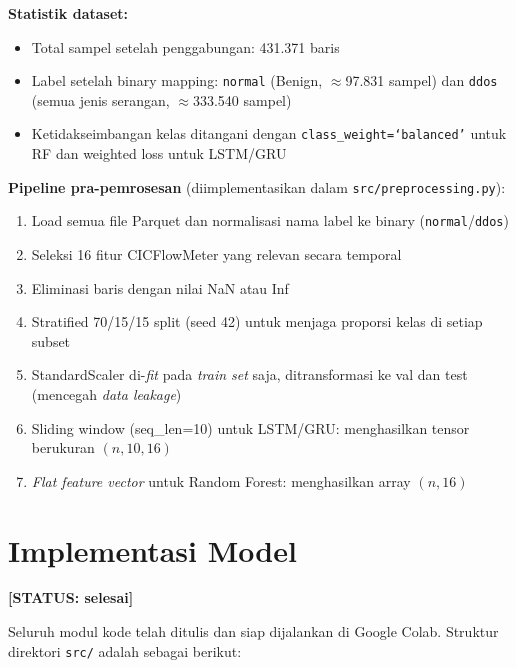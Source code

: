 \documentclass[11pt,a4paper,oneside]{report}
\newcommand{\statusbox}[1]{\textbf{[STATUS: #1]}}
\begin{document}
\textbf{Statistik dataset:}
\begin{itemize}[leftmargin=*]
    \item Total sampel setelah penggabungan: 431.371 baris
    \item Label setelah binary mapping: \texttt{normal} (Benign, $\approx$97.831 sampel) dan \texttt{ddos} (semua jenis serangan, $\approx$333.540 sampel)
    \item Ketidakseimbangan kelas ditangani dengan \texttt{class\_weight=`balanced'} untuk RF dan weighted loss untuk LSTM/GRU
\end{itemize}

\textbf{Pipeline pra-pemrosesan} (diimplementasikan dalam \texttt{src/preprocessing.py}):
\begin{enumerate}[leftmargin=*]
    \item Load semua file Parquet dan normalisasi nama label ke binary (\texttt{normal}/\texttt{ddos})
    \item Seleksi 16 fitur CICFlowMeter yang relevan secara temporal
    \item Eliminasi baris dengan nilai NaN atau Inf
    \item Stratified 70/15/15 split (seed 42) untuk menjaga proporsi kelas di setiap subset
    \item StandardScaler di-\textit{fit} pada \textit{train set} saja, ditransformasi ke val dan test (mencegah \textit{data leakage})
    \item Sliding window (seq\_len=10) untuk LSTM/GRU: menghasilkan tensor berukuran $(n, 10, 16)$
    \item \textit{Flat feature vector} untuk Random Forest: menghasilkan array $(n, 16)$
\end{enumerate}

\section{Implementasi Model}

\statusbox{selesai}

Seluruh modul kode telah ditulis dan siap dijalankan di Google Colab. Struktur direktori \texttt{src/} adalah sebagai berikut:
\end{document}
